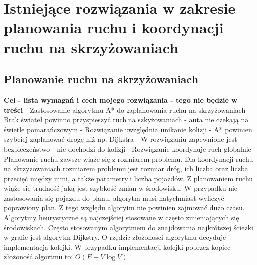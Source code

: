 \chapter{Istniejące rozwiązania w zakresie planowania ruchu i koordynacji ruchu na skrzyżowaniach} \label{chap:state-of-the-art}

\section{Planowanie ruchu na skrzyżowaniach}

\textbf{Cel - lista wymagań i cech mojego rozwiązania - tego nie będzie w treści}
\newline
- Zastosowanie algorytmu A* do zaplanowania ruchu na skrzyżowaniach
\newline
- Brak świateł powinno przyspieszyć ruch na szkyżowaniach - auta nie czekają na świetle pomarańczowym
\newline
- Rozwiązanie uwzględnia unikanie kolizji
\newline
- A* powinien szybciej zaplanować drogę niż np. Dijkstra
\newline
- W rozwiązaniu zapewnione jest bezpieczeństwo - nie dochodzi do kolizji
\newline
- Rozwiązanie koordynuje ruch globalnie
\newline
\newline
\newline
\newline
\indent
  Planowanie ruchu zawsze wiąże się z rozmiarem problemu. Dla koordynacji ruchu na skrzyżowaniach rozmiarem problemu jest rozmiar dróg, ich liczba oraz liczba przecięć między nimi, a także parametry i liczba pojazdów. Z planowaniem ruchu wiąże się trudność jaką jest szybkość zmian w środowisku. W przypadku nie zastosowania się pojazdu do planu, algorytm musi natychmiast wyliczyć poprawiony plan. Z tego względu algorytm nie powinien zajmować dużo czasu. Algorytmy heurystyczne są najczejściej stosowane w często zmieniających się środowiskach.
\newline
\indent
  Często stosowanym algorytmem do znajdowania najkrótszej ścieżki w grafie jest algorytm Dijkstry. O rzędzie złożoności algorytmu decyduje implementacja kolejki. W przypadku implementacji kolejki poprzez kopiec złożoność algortmu to:
\newline
\newline
\begin{math}
O(E + V\log V)
\end{math}
\newline
